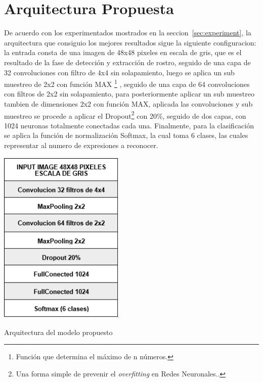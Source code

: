 \section{Arquitectura Propuesta}
\label{sec:arq_propuesta}
De acuerdo con los experimentados mostrados en la seccion~\ref{sec:experiment}, la arquitectura que consiguio los mejores resultados sigue la siguiente configuracion: la entrada consta de una imagen de 48x48 pixeles en escala de gris, que es el resultado de la fase de detección y extracción de rostro, seguido de una capa de 32 convoluciones con filtro de 4x4 sin solapamiento, luego se aplica un sub muestreo de 2x2 con función MAX \footnote[6]{Función que determina el máximo de n números.} , seguido de una capa de 64 convoluciones con filtros de 2x2 sin solapamiento, para posteriormente aplicar un sub muestreo tambien de dimensiones 2x2 con función MAX, aplicada las convoluciones y sub muestreo se procede a aplicar el Dropout\footnote[7]{Una forma simple de prevenir el \textit{overfitting} en Redes Neuronales..} con 20\%, seguido de dos capas, con 1024 neuronas totalmente conectadas cada una. Finalmente, para la clasificación se aplica la función de normalización Softmax, la cual toma 6 clases, las cuales representar al numero de expresiones a reconocer.
\vspace{0.5cm}
\begin{table}[H]
    \centering
    \includegraphics[width=60mm]{Imagenes/tabla_arquitectura.png}
    \caption{Arquitectura del modelo propuesto}
    \label{tab:tabla_arquitectura}
\end{table}


